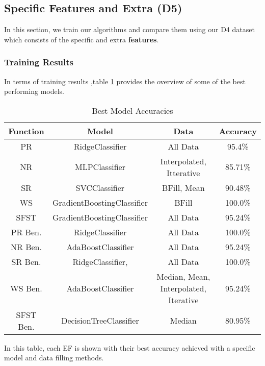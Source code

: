 \documentclass[12pt,letterpaper]{article}
\begin{document}
\subsection{Specific Features and Extra (D5)}\label{sec:class_allxtra}
In this section, we train our algorithms and compare them using our D4 dataset which consists of the specific and extra \textbf{features}.
\subsubsection{Training Results}
In terms of training results ,table \ref{tab_class:specxtra_model_accuracies_best} provides the overview of some of the best performing models.


\begin{table}[H]
\centering
\begin{tabular}{|c|c|c|c|}
\hline
\textbf{Function} & \textbf{Model} & \textbf{Data} & \textbf{Accuracy} \\
\hline

PR & RidgeClassifier & All Data & 95.4\% \\
\hline
NR & MLPClassifier & Interpolated, Itterative & 85.71\% \\
\hline
SR & SVCClassifier & BFill, Mean & 90.48\% \\
\hline
WS & GradientBoostingClassifier & BFill & 100.0\% \\
\hline
SFST & GradientBoostingClassifier & All Data & 95.24\% \\
\hline
PR Ben. & RidgeClassifier
 & All Data & 100.0\% \\
\hline
NR Ben. & AdaBoostClassifier & All Data & 95.24\% \\
\hline
SR Ben. & RidgeClassifier, 
 & All Data & 100.0\% \\ 
 \hline
WS Ben. & AdaBoostClassifier & Median, Mean, Interpolated, Iterative & 95.24\% \\
\hline
SFST Ben. & DecisionTreeClassifier & Median & 80.95\% \\
\hline

\end{tabular}
\caption{Best Model Accuracies}
\label{tab_class:specxtra_model_accuracies_best}
\end{table}

In this table, each \ac{EF} is shown with their best accuracy achieved with a specific model and data filling methods.
\end{document}
